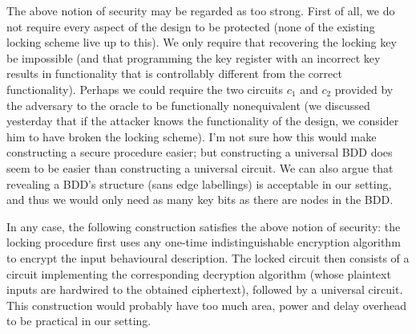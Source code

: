The above notion of security may be regarded as too strong. First of all, we do not require every aspect of the design to be protected (none of the existing locking scheme live up to this). We only require that recovering the locking key be impossible (and that programming the key register with an incorrect key results in functionality that is controllably different from the correct functionality). Perhaps we could require the two circuits $c_1$ and $c_2$ provided by the adversary to the oracle to be functionally nonequivalent (we discussed yesterday that if the attacker knows the functionality of the design, we consider him to have broken the locking scheme). I'm not sure how this would make constructing a secure procedure easier; but constructing a universal BDD does seem to be easier than constructing a universal circuit. We can also argue that revealing a BDD's structure (sans edge labellings) is acceptable in our setting, and thus we would only need as many key bits as there are nodes in the BDD.

In any case, the following construction satisfies the above notion of security: the locking procedure first uses any one-time indistinguishable encryption algorithm to encrypt the input behavioural description. The locked circuit then consists of a circuit implementing the corresponding decryption algorithm (whose plaintext inputs are hardwired to the obtained ciphertext), followed by a universal circuit. This construction would probably have too much area, power and delay overhead to be practical in our setting.



